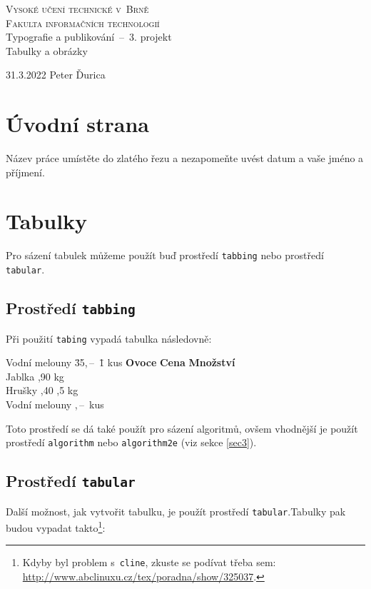 \documentclass[11pt, a4paper]{article}
\begin{document}
\begin{titlepage}
\begin{center}
\Huge
\textsc{Vysoké učení technické v~Brně}\\
\huge
\textsc{Fakulta informačních technologií}\\
\LARGE Typografie a publikování \,--\, 3. projekt\\
\Huge Tabulky a obrázky
\end{center}
{\LARGE 31.3.2022 \hfill
Peter Ďurica}
\thispagestyle{empty}
\end{titlepage}
\clearpage

\setcounter{page}{1}
\section{Úvodní strana}
Název práce umístěte do zlatého řezu a nezapomeňte uvést  datum a vaše jméno a příjmení.
\section{Tabulky}
Pro sázení tabulek můžeme použít buď prostředí \texttt{tabbing} nebo prostředí \texttt{tabular}.
\subsection{Prostředí \texttt{tabbing}}
Při použití \texttt{tabing} vypadá tabulka následovně:
\begin{tabbing}
Vodní melouny \quad \= 35,\,--\, \quad \= 1 kus \kill
\textbf{Ovoce} \> \textbf{Cena} \> \textbf{Množství} \\
Jablka ,90  kg \\
Hrušky ,40 ,5 kg \\
Vodní melouny ,\,--\,  kus \\
\end{tabbing}
Toto prostředí se dá také použít pro sázení algoritmů, ovšem vhodnější je použít prostředí \texttt{algorithm} nebo \texttt{algorithm2e} (viz sekce \ref{sec3}).
\subsection{Prostředí \texttt{tabular}}
Další možnost, jak vytvořit tabulku, je použít prostředí \texttt{tabular}.Tabulky pak budou vypadat takto\footnote{Kdyby byl problem s~\texttt{cline}, zkuste se podívat třeba sem: \href{http://www.abclinuxu.cz/tex/poradna/show/325037}{http://www.abclinuxu.cz/tex/poradna/show/325037}.}:
\end{document}
